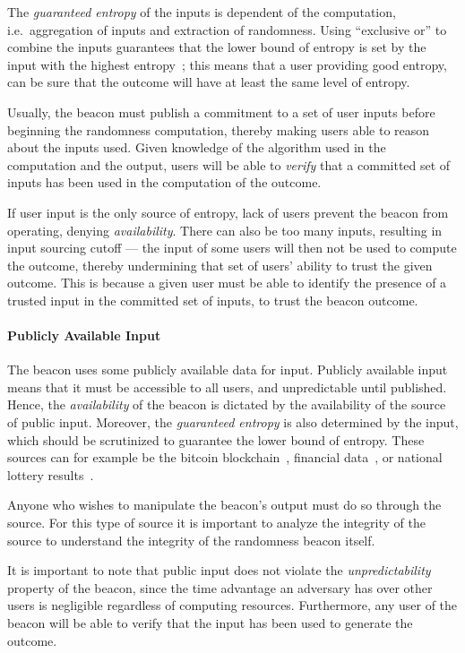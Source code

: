 The \emph{guaranteed entropy} of the inputs is dependent of the computation, i.e.\ aggregation of inputs and extraction of randomness.
Using \enquote{exclusive or} to combine the inputs guarantees that the lower bound of entropy is set by the input with the highest entropy~\cite{lenstra2015random};
this means that a user providing good entropy, can be sure that the outcome will have at least the same level of entropy.

Usually, the beacon must publish a commitment to a set of user inputs before beginning the randomness computation,  thereby making users able to reason about the inputs used.
Given knowledge of the algorithm used in the computation and the output, users will be able to \emph{verify} that a committed set of inputs has been used in the computation of the outcome.

If user input is the only source of entropy, lack of users prevent the beacon from operating, denying \emph{availability}.
There can also be too many inputs, resulting in input sourcing cutoff ---
the input of some users will then not be used to compute the outcome, thereby undermining that set of users' ability to trust the given outcome.
This is because a given user must be able to identify the presence of a trusted input in the committed set of inputs, to trust the beacon outcome.

\paragraph{Publicly Available Input}
The beacon uses some publicly available data for input.
Publicly available input means that it must be accessible to all users, and unpredictable until published.
Hence, the \emph{availability} of the beacon is dictated by the availability of the source of public input.
Moreover, the \emph{guaranteed entropy} is also determined by the input, which should be scrutinized to guarantee the lower bound of entropy.
These sources can for example be the bitcoin blockchain~\cite{bonneau2015bitcoin, bentov2016bitcoin}, financial data~\cite{clark2010use}, or national lottery results~\cite{baigneres2015trap}.

Anyone who wishes to manipulate the beacon's output must do so through the source.
For this type of source it is important to analyze the integrity of the source to understand the integrity of the randomness beacon itself.

It is important to note that public input does not violate the \emph{unpredictability} property of the beacon, since the time advantage an adversary has over other users is negligible regardless of computing resources.
Furthermore, any user of the beacon will be able to verify that the input has been used to generate the outcome.

